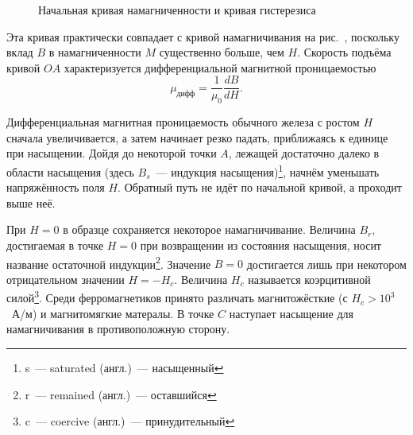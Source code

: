 
\begin{wrapfigure}{r}{0.4\textwidth}
	\caption{Начальная кривая намагниченности и кривая гистерезиса}
\end{wrapfigure}

Эта кривая практически совпадает с кривой намагничивания на рис.~, поскольку вклад $B$ в намагниченности $M$ существенно больше, чем $H$. Скорость подъёма кривой $OA$ характеризуется  дифференциальной магнитной проницаемостью
\begin{equation*}
	\mu_{\text{дифф}} = \frac{1}{\mu_0} \frac{dB}{dH}.
\end{equation*}

Дифференциальная магнитная проницаемость обычного железа с ростом $H$ сначала увеличивается, а затем начинает резко падать, приближаясь к единице при насыщении. Дойдя до некоторой точки $A$, лежащей достаточно далеко в области насыщения (здесь $B_s$~--- индукция насыщения)\footnote[1]{s~--- saturated (англ.)~--- насыщенный}, начнём уменьшать напряжённость поля $H$.
 Обратный путь не идёт по начальной кривой, а проходит выше неё.
 
 
При $H = 0$ в образце сохраняется некоторое намагничивание. Величина $B_r$, достигаемая в точке $H = 0$ при возвращении из состояния насыщения, носит название остаточной индукции\footnote[2]{r~--- remained (англ.)~--- оставшийся}. Значение $B = 0$ достигается лишь при некотором отрицательном значении $H = - H_c$. Величина $H_c$ называется коэрцитивной силой\footnote[3]{c~--- coercive (англ.)~--- принудительный}. Среди ферромагнетиков принято различать магнитожёсткие (с $H_c > 10^3$~А/м) и магнитомягкие матералы. В точке $C$ наступает насыщение для намагничивания в противоположную сторону.

